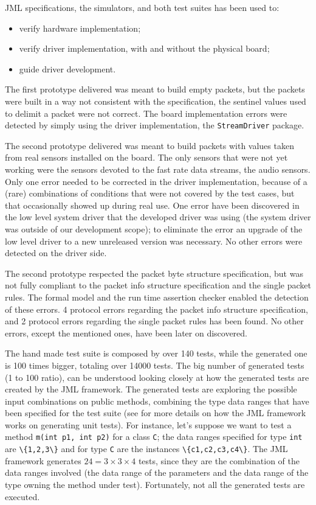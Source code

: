 \documentclass{article} \usepackage{times}
\newcommand{\lil}[1]{\texttt{\lstinline|#1|}}
\begin{document}
JML specifications, the simulators, and both test suites has been used
to:

\begin{itemize}
\item verify hardware implementation;
\item verify driver implementation, with and without the physical
  board;
\item guide driver development.
\end{itemize}

The first \STSB prototype delivered was meant to build empty packets,
but the packets were built in a way not consistent with the
specification, the sentinel values used to delimit a packet were not
correct.  The board implementation errors were detected by simply
using the driver implementation, the \lil{StreamDriver} package.

The second prototype delivered was meant to build packets with values
taken from real sensors installed on the board.  The only sensors that
were not yet working were the sensors devoted to the fast rate data
streams, the audio sensors.  Only one error needed to be corrected in
the driver implementation, because of a (rare) combinations of
conditions that were not covered by the test cases, but that
occasionally showed up during real use.  One error have been
discovered in the low level system driver that the developed driver
was using (the system driver was outside of our development scope); to
eliminate the error an upgrade of the low level driver to a new
unreleased version was necessary.  No other errors were detected on
the driver side.

The second prototype respected the packet byte structure
specification, but was not fully compliant to the packet info
structure specification and the single packet rules.  The formal model
and the run time assertion checker enabled the detection of these
errors.  4 protocol errors regarding the packet info structure
specification, and 2 protocol errors regarding the single packet rules
has been found. No other errors, except the mentioned ones, have
been later on discovered.

The hand made test suite is composed by over 140 tests, while the
generated one is 100 times bigger, totaling over 14000 tests.  The big
number of generated tests (1 to 100 ratio), can be understood looking
closely at how the generated tests are created by the JML
framework. The generated tests are exploring the possible input
combinations on public methods, combining the type data ranges that
have been specified for the test suite (see \cite{Cheon-Leavens02} for
more details on how the JML framework works on generating unit
tests). For instance, let's suppose we want to test a method
\lil{m(int p1, int p2)} for a class \lil{C}; the data ranges specified
for type \lil{int} are \lil{\{1,2,3\}} and for type \lil{C} are the
instances \lil{\{c1,c2,c3,c4\}}. The JML framework generates $24 = 3
\times 3 \times 4$ tests, since they are the combination of the data
ranges involved (the data range of the parameters and the data range
of the type owning the method under test). Fortunately, not all the
generated tests are executed.
\end{document}
